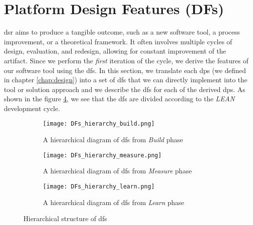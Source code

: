 \section{Platform Design Features (DFs)}
\label{implementation:section:designfeatures}
\ac{dsr} aims to produce a tangible outcome, such as a new software tool, a process improvement, or a theoretical framework.
It often involves multiple cycles of design, evaluation, and redesign, allowing for constant improvement of the artifact.
Since we perform the \textit{first} iteration of the cycle, we derive the features of our software tool using the \ac{df}s.
In this section, we translate each \ac{dp}s (we defined in chapter \ref{chap:design}) into a set of \ac{df}s that we can directly implement into the tool or solution approach and we describe the \ac{df}s for each of the derived \ac{dp}s.
As shown in the figure \ref{fig:implementation:hierarchy}, we see that the \ac{df}s are divided according to the \textit{LEAN} development cycle.
\clearpage
\begin{landscape} 
\begin{figure}[htbp!]
    \centering
    \begin{subfigure}[b]{1.0\textwidth}
    \centering
    \texttt{[image: DFs\_hierarchy\_build.png]}
    \caption{A hierarchical diagram of \ac{df}s from \textit{Build} phase}
    \label{fig:implementation:hierarchy:build}
    \end{subfigure}
    \begin{subfigure}[b]{1.0\textwidth}
    \centering
    \texttt{[image: DFs\_hierarchy\_measure.png]}
    \caption{A hierarchical diagram of \ac{df}s from \textit{Measure} phase}
    \label{fig:implementation:hierarchy:measure} 
    \end{subfigure}             
    \begin{subfigure}[b]{0.8\textwidth}
    \centering
    \texttt{[image: DFs\_hierarchy\_learn.png]}
    \caption{A hierarchical diagram of \ac{df}s from \textit{Learn} phase}
    \label{fig:implementation:hierarchy:learn}
    \end{subfigure}
    \caption[A map between \ac{dp}s and \ac{df}s]{Hierarchical structure of \ac{df}s}
    \label{fig:implementation:hierarchy}
\end{figure}
\end{landscape}
